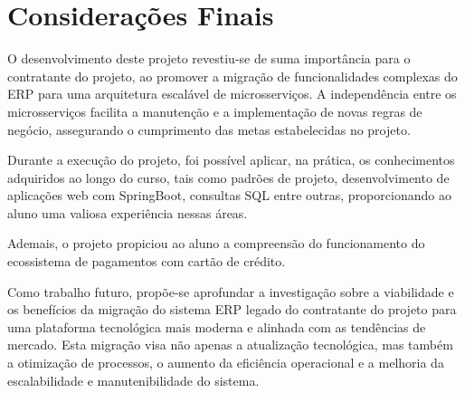 \chapter{Considerações Finais}
\label{cap:conclusoes}

O desenvolvimento deste projeto revestiu-se de suma importância para o contratante do projeto, ao promover a migração de 
funcionalidades complexas do ERP para uma arquitetura escalável de microsserviços. A independência entre os 
microsserviços facilita a manutenção e a implementação de novas regras de negócio, assegurando o cumprimento das metas 
estabelecidas no projeto.

Durante a execução do projeto, foi possível aplicar, na prática, os conhecimentos adquiridos ao longo do curso, 
tais como padrões de projeto, desenvolvimento de aplicações web com SpringBoot, consultas SQL entre outras, proporcionando 
ao aluno uma valiosa experiência nessas áreas.

Ademais, o projeto propiciou ao aluno a compreensão do funcionamento do ecossistema de pagamentos com cartão de crédito.

Como trabalho futuro, propõe-se aprofundar a investigação sobre a viabilidade e os benefícios da migração do sistema ERP 
legado do contratante do projeto para uma plataforma tecnológica mais moderna e alinhada com as tendências de mercado. Esta migração 
visa não apenas a atualização tecnológica, mas também a otimização de processos, o aumento da eficiência operacional e a 
melhoria da escalabilidade e manutenibilidade do sistema.


